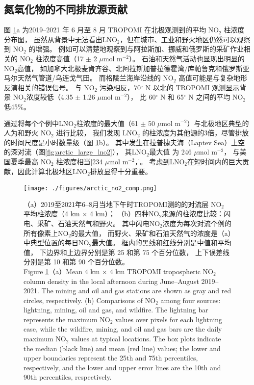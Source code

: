 \subsection{氮氧化物的不同排放源贡献}


图 \ref{fig:arctic_no2_comp}a 为2019--2021 年 6 月至 8 月 TROPOMI 在北极观测到的平均 NO$_2$ 柱浓度分布图，
虽然从背景中无法看出LNO$_2$，但在城市、工业和野火地区仍然可以观察到 NO$_2$ 的增强。
例如可以清楚地观察到与阿拉斯加、挪威和俄罗斯的采矿作业相关的 NO$_2$ 柱浓度高值（17 $\pm$ 2 $\mu$mol m$^{-2}$）。
石油和天然气活动也显现出明显的NO$_2$高值，
如加拿大北极麦肯齐谷、北阿拉斯加普拉德霍湾/库帕鲁克和俄罗斯亚马尔天然气管道/乌连戈气田\citep{VanDerA.2020}。
而格陵兰海岸沿线的 NO$_2$ 高值可能是与复杂地形反演相关的错误信号\citep{Hachmeister.2022}。
与 NO$_2$ 污染相反，70$^{\circ}$ N 以北的 TROPOMI 观测显示背景 NO$_2$浓度较低（4.35 $\pm$ 1.26 $\mu$mol m$^{-2}$），
比 60$^{\circ}$ N 和 65$^{\circ}$ N 之间的平均 NO$_2$ 低45\%。

通过将每个个例中LNO$_2$柱浓度的最大值（61 $\pm$ 50 $\mu$mol m$^{-2}$）与北极地区典型的人为和野火 NO$_2$ 进行比较，
我们发现 LNO$_2$ 的柱浓度为其他源的3倍，尽管排放的时间尺度是小时数量级（图 \ref{fig:arctic_no2_comp}b）。
其中发生在拉普捷夫海（Laptev Sea）上空的深对流（图\ref{fig:arctic_large_lno2}），
其LNO$_2$最大值 为 246 $\mu$mol m$^{-2}$，
与美国夏季最高 NO$_2$ 柱浓度相当[234 $\mu$mol m$^{-2}$，\citet{Goldberg.2021a}]。
考虑到LNO$_2$在短时间内的巨大贡献，因此计算北极地区LNO$_2$排放显得十分重要。

\begin{figure}[!htbp]
\centering
\texttt{[image: ./figures/arctic\_no2\_comp.png]}
\caption{
（a）2019至2021年6--8月当地下午时TROPOMI测的的对流层 NO$_2$ 平均柱浓度（4 km $\times$ 4 km）；
（b）四种NO$_2$来源的柱浓度比较：闪电、采矿、石油天然气和野火。
其中闪电NO$_2$浓度为每次对流个例的所有像素上NO$_2$的最大值，
而野火、采矿和石油天然气的浓度是（a）中典型位置的每日NO$_2$最大值。
框内的黑线和红线分别是中值和平均值，
下边界和上边界分别是第 25 和第 75 个百分位数，
上下误差线分别是第 10 和第 90 个百分位数。\\
Figure \ref{fig:arctic_no2_comp}（a）Mean 4 km $\times$ 4 km TROPOMI tropospheric NO$_2$ column density in the local afternoon during June--August 2019--2021.
The mining and oil and gas stations are shown as gray and red circles, respectively.
(b) Comparisons of NO$_2$ among four sources: lightning, mining, oil and gas, and wildfire.
The lightning bar represents the maximum NO$_2$ values over pixels for each lightning case,
while the wildfire, mining, and oil and gas bars are the daily maximum NO$_2$ values at typical locations.
The box plots indicate the median (black line) and mean (red line) values; the lower and upper boundaries represent the 25th and 75th percentiles, respectively, and the lower and upper error lines are the 10th and 90th percentiles, respectively.
}
\label{fig:arctic_no2_comp}
\end{figure}

